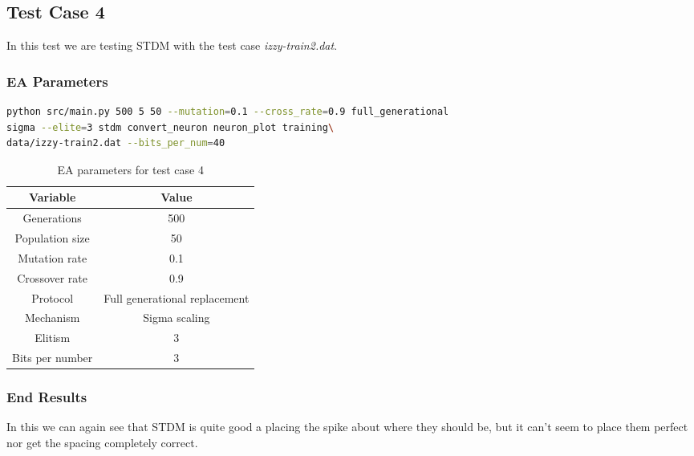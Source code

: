 \subsection{Test Case 4}\label{sec:test-case-4}
In this test we are testing STDM with the test case
\textit{izzy-train2.dat}.
\subsubsection{EA Parameters}\label{sec:test-case-4-parameters}
\begin{lstlisting}[frame=single, language=bash, caption=Command-line to
replicate the results]
python src/main.py 500 5 50 --mutation=0.1 --cross_rate=0.9 full_generational
sigma --elite=3 stdm convert_neuron neuron_plot training\
data/izzy-train2.dat --bits_per_num=40
\end{lstlisting}
\begin{table}
	\begin{tabular}{c c}
		Variable & Value \\
		\hline
		Generations & 500 \\
		\hline
		Population size & 50 \\
		\hline
		Mutation rate & 0.1 \\
		\hline
		Crossover rate & 0.9 \\
		\hline
		Protocol & Full generational replacement \\
		\hline
		Mechanism & Sigma scaling \\
		\hline
		Elitism & 3 \\
		\hline
		Bits per number & 3 \\
	\end{tabular}
	\caption{EA parameters for test case 4}
\end{table}
\subsubsection{End Results}\label{sec:test-case-4-results}
In this we can again see that STDM is quite good a placing the spike about where
they should be, but it can't seem to place them perfect nor get the spacing
completely correct.

